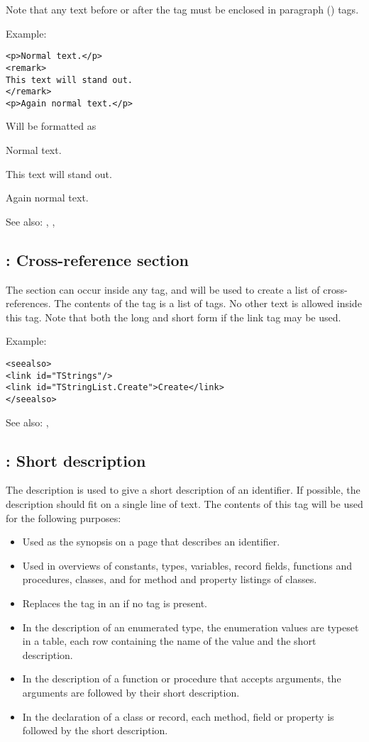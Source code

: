 Note that any text before or after the  tag must be enclosed in
paragraph () tags.

Example:
\begin{verbatim}
<p>Normal text.</p>
<remark>
This text will stand out.
</remark>
<p>Again normal text.</p>
\end{verbatim}
Will be formatted as

Normal text.
\begin{remark}
This text will stand out.
\end{remark}
Again normal text.

See also: , , 

\subsection{ : Cross-reference section}
\label{tag:seealso}
The  section can occur inside any  tag, and will
be used to create a list of cross-references. The contents of the
 tag is a list of  tags. No other text is allowed
inside this tag. Note that both the long and short form if the link tag may
be used.

Example:
\begin{verbatim}
<seealso>
<link id="TStrings"/>
<link id="TStringList.Create">Create</link>
</seealso>
\end{verbatim}

See also: , 

\subsection{ : Short description}
\label{tag:short}
The  description is used to give a short description of an
identifier. If possible, the description should fit on a single line of
text. The contents of this tag will be used for the following purposes:
\begin{itemize}
\item Used as the synopsis on a page that describes an identifier.
\item Used in overviews of constants, types, variables, record fields, 
functions and procedures, classes, and for method and property listings of classes.
\item Replaces the  tag in an  if no  tag is present.
\item In the description of an enumerated type, the enumeration values are
typeset in a table, each row containing the name of the value and the short
description.
\item In the description of a function or procedure that accepts arguments,
the arguments are followed by their short description.
\item In the declaration of a class or record, each method, field or property
is followed by the short description.
\end{itemize}

